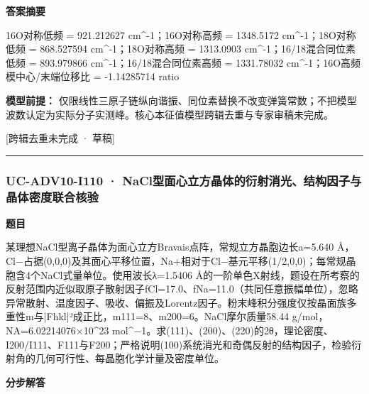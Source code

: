 \documentclass[UTF8,11pt,a4paper]{ctexart}
\begin{document}
\noindent\textbf{答案摘要}\par
16O对称低频 = 921.212627 cm\textasciicircum{}-1；16O对称高频 = 1348.5172 cm\textasciicircum{}-1；18O对称低频 = 868.527594 cm\textasciicircum{}-1；18O对称高频 = 1313.0903 cm\textasciicircum{}-1；16/18混合同位素低频 = 893.979866 cm\textasciicircum{}-1；16/18混合同位素高频 = 1331.78032 cm\textasciicircum{}-1；16O高频模中心/末端位移比 = -1.14285714 ratio\par
\noindent\textbf{模型前提：}
仅限线性三原子链纵向谐振、同位素替换不改变弹簧常数；不把模型波数认定为实际分子实测峰。核心本征值模型跨辑去重与专家审稿未完成。\par
\noindent\textcolor{red!65!black}{[跨辑去重未完成 · 草稿]} \par
\medskip\hrule\medskip
{}
\subsubsection*{UC-ADV10-I110 · NaCl型面心立方晶体的衍射消光、结构因子与晶体密度联合核验}
\noindent\textbf{题目}\par
某理想NaCl型离子晶体为面心立方Bravais点阵，常规立方晶胞边长a=5.640 Å，Cl−占据(0,0,0)及其面心平移位置，Na+相对于Cl−基元平移(1/2,0,0)；每常规晶胞含4个NaCl式量单位。使用波长λ=1.5406 Å的一阶单色X射线，题设在所考察的反射范围内近似取原子散射因子fCl=17.0、fNa=11.0（共同任意振幅单位），忽略异常散射、温度因子、吸收、偏振及Lorentz因子。粉末峰积分强度仅按晶面族多重性m与|Fhkl|²成正比，m111=8、m200=6。NaCl摩尔质量58.44 g/mol，NA=6.02214076×10\textasciicircum{}23 mol\textasciicircum{}−1。求(111)、(200)、(220)的2θ，理论密度、I200/I111、F111与F200；严格说明(100)系统消光和奇偶反射的结构因子，检验衍射角的几何可行性、每晶胞化学计量及密度单位。\par
\medskip\noindent\textbf{分步解答}
\end{document}

